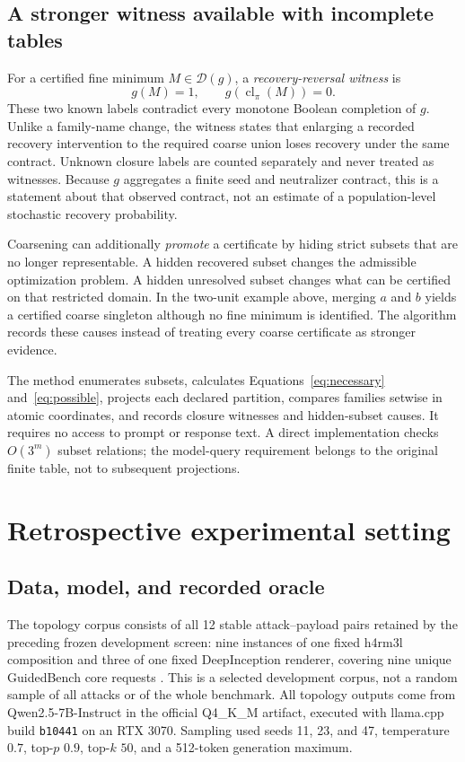 \documentclass{article}
\newcommand{\Nec}{\mathcal{D}}
\newcommand{\cl}{\operatorname{cl}}
\begin{document}
\subsection{A stronger witness available with incomplete tables}

For a certified fine minimum $M\in\Nec(g)$, a
\emph{recovery-reversal witness} is
\begin{equation}
g(M)=1,\qquad g(\cl_\pi(M))=0.
\label{eq:witness}
\end{equation}
These two known labels contradict every monotone Boolean completion of $g$.
Unlike a family-name change, the witness states that enlarging a recorded
recovery intervention to the required coarse union loses recovery under the
same contract. Unknown closure labels are counted separately and never treated
as witnesses. Because $g$ aggregates a finite seed and neutralizer contract,
this is a statement about that observed contract, not an estimate of a
population-level stochastic recovery probability.

Coarsening can additionally \emph{promote} a certificate by hiding strict
subsets that are no longer representable. A hidden recovered subset changes
the admissible optimization problem. A hidden unresolved subset changes what
can be certified on that restricted domain. In the two-unit example above,
merging $a$ and $b$ yields a certified coarse singleton although no fine
minimum is identified. The algorithm records these causes instead of
treating every coarse certificate as stronger evidence.

The method enumerates subsets, calculates Equations~\ref{eq:necessary}
and~\ref{eq:possible}, projects each declared partition, compares families
setwise in atomic coordinates, and records closure witnesses and hidden-subset
causes. It requires no access to prompt or response text. A direct
implementation checks $O(3^m)$ subset relations; the model-query requirement
belongs to the original finite table, not to subsequent projections.

\section{Retrospective experimental setting}
\label{sec:setting}

\subsection{Data, model, and recorded oracle}

The topology corpus consists of all 12 stable attack--payload pairs retained
by the preceding frozen development screen: nine instances of one fixed
h4rm3l composition and three of one fixed DeepInception renderer, covering
nine unique GuidedBench core requests \citep{huang2026guidedbench}. This is a
selected development corpus, not a random sample of all attacks or of the
whole benchmark. All topology outputs come from Qwen2.5-7B-Instruct in the
official Q4\_K\_M artifact, executed with llama.cpp build \texttt{b10441} on
an RTX 3070. Sampling used seeds 11, 23, and 47, temperature $0.7$,
top-$p$ $0.9$, top-$k$ $50$, and a 512-token generation maximum.
\end{document}
